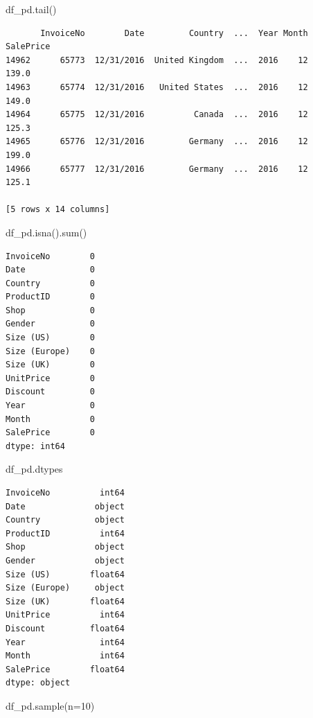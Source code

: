 \documentclass[
  letterpaper,
  DIV=11,
  numbers=noendperiod]{scrreprt}
\newenvironment{Shaded}{\begin{snugshade}}{\end{snugshade}}
\newcommand{\BuiltInTok}[1]{\textcolor[rgb]{0.00,0.23,0.31}{#1}}
\newcommand{\DecValTok}[1]{\textcolor[rgb]{0.68,0.00,0.00}{#1}}
\newcommand{\NormalTok}[1]{\textcolor[rgb]{0.00,0.23,0.31}{#1}}
\newcommand{\OperatorTok}[1]{\textcolor[rgb]{0.37,0.37,0.37}{#1}}
\begin{document}
\begin{Shaded}
\begin{Highlighting}[]
\NormalTok{df\_pd.tail()}
\end{Highlighting}
\end{Shaded}

\begin{verbatim}
       InvoiceNo        Date         Country  ...  Year Month SalePrice
14962      65773  12/31/2016  United Kingdom  ...  2016    12     139.0
14963      65774  12/31/2016   United States  ...  2016    12     149.0
14964      65775  12/31/2016          Canada  ...  2016    12     125.3
14965      65776  12/31/2016         Germany  ...  2016    12     199.0
14966      65777  12/31/2016         Germany  ...  2016    12     125.1

[5 rows x 14 columns]
\end{verbatim}

\begin{Shaded}
\begin{Highlighting}[]
\NormalTok{df\_pd.isna().}\BuiltInTok{sum}\NormalTok{()}
\end{Highlighting}
\end{Shaded}

\begin{verbatim}
InvoiceNo        0
Date             0
Country          0
ProductID        0
Shop             0
Gender           0
Size (US)        0
Size (Europe)    0
Size (UK)        0
UnitPrice        0
Discount         0
Year             0
Month            0
SalePrice        0
dtype: int64
\end{verbatim}

\begin{Shaded}
\begin{Highlighting}[]
\NormalTok{df\_pd.dtypes}
\end{Highlighting}
\end{Shaded}

\begin{verbatim}
InvoiceNo          int64
Date              object
Country           object
ProductID          int64
Shop              object
Gender            object
Size (US)        float64
Size (Europe)     object
Size (UK)        float64
UnitPrice          int64
Discount         float64
Year               int64
Month              int64
SalePrice        float64
dtype: object
\end{verbatim}

\begin{Shaded}
\begin{Highlighting}[]
\NormalTok{df\_pd.sample(n}\OperatorTok{=}\DecValTok{10}\NormalTok{)}
\end{Highlighting}
\end{Shaded}
\end{document}
